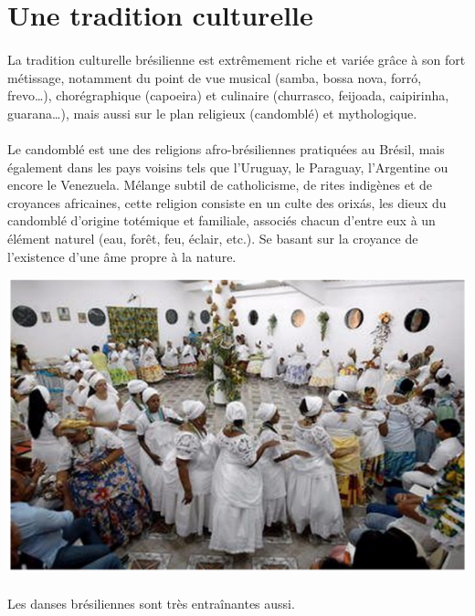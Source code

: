 \section{Une tradition culturelle}

\paragraph{} La tradition culturelle brésilienne est extrêmement riche et
variée grâce à son fort métissage, notamment du point de vue musical (samba,
bossa nova, forró, frevo\ldots), chorégraphique (capoeira) et culinaire
(churrasco, feijoada, caipirinha, guarana\ldots), mais aussi sur le plan religieux
(candomblé) et mythologique.

\paragraph{} Le candomblé est une des religions afro-brésiliennes pratiquées au
Brésil, mais également dans les pays voisins tels que l'Uruguay, le Paraguay,
l'Argentine ou encore le Venezuela. Mélange subtil de catholicisme, de rites
indigènes et de croyances africaines, cette religion consiste en un culte des
orixás, les dieux du candomblé d'origine totémique et familiale, associés
chacun d'entre eux à un élément naturel (eau, forêt, feu, éclair, etc.). Se
basant sur la croyance de l'existence d'une âme propre à la nature.

\begin{center}
	\includegraphics[scale=0.5]{bresil3.png}
\end{center}

\paragraph{} Les danses brésiliennes sont très entraînantes aussi.

